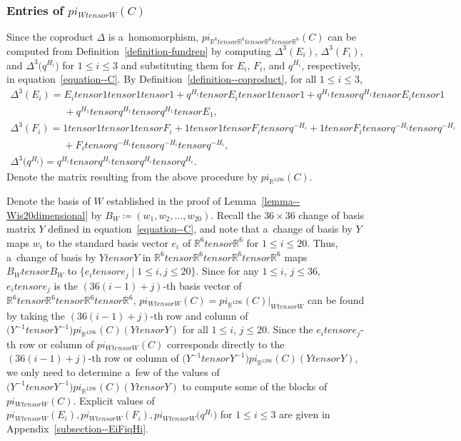 \documentclass[10pt,a4paper]{amsart}
\numberwithin{equation}{section}
\theoremstyle{definition}
\def\boldsymbol#1{#1}
\def\pi{pi}
\def\otimes{ tensor }
\begin{document}
\subsubsection[Entries of pi(W tensor W)(C)]{Entries of $\boldsymbol{\pi_{W \otimes W}(C)}$}
Since the coproduct $\Delta$ is a~homomorphism, $\pi_{\mathbb{R}^6 \otimes \mathbb{R}^6 \otimes \mathbb{R}^6 \otimes \mathbb{R}^6}(C)$ can be computed from Definition~\ref{definition-fundrep} by computing $\Delta^3(E_i)$, $\Delta^3(F_i)$, and $\Delta^3\bigl(q^{H_i}\bigr)$ for $1 \le i \le 3$ and substituting them for $E_i$, $F_i$, and $q^{H_i}$, respectively, in equation~\eqref{equation--C}. By Definition~\ref{definition--coproduct}, for all $1 \le i \le 3$,
\begin{gather*}
 \Delta^3 (E_i) = E_i \otimes 1 \otimes 1 \otimes 1 + q^{H_i} \otimes E_i \otimes 1 \otimes 1 + q^{H_1} \otimes q^{H_1} \otimes E_i \otimes 1\\
 \phantom{ \Delta^3 (E_i) =}{}+ q^{H_1} \otimes q^{H_1} \otimes q^{H_1} \otimes E_1 ,\\
 \Delta^3 (F_i) = 1 \otimes 1 \otimes 1 \otimes F_i + 1 \otimes 1 \otimes F_i \otimes q^{-H_i} + 1 \otimes F_i \otimes q^{-H_i} \otimes q^{-H_i}\\
 \phantom{\Delta^3 (F_i) =}{}+ F_i \otimes q^{-H_i} \otimes q^{-H_i} \otimes q^{-H_i} ,\\
 \Delta^3 \bigl(q^{H_i}\bigr) = q^{H_i} \otimes q^{H_i} \otimes q^{H_i} \otimes q^{H_i}.
\end{gather*}
Denote the matrix resulting from the above procedure by $\pi_{\mathbb{R}^{1296}} (C)$.


Denote the basis of $W$ established in the proof of Lemma~\ref{lemma--Wis20dimensional} by $B_W \coloneqq (w_1,w_2,\dots,w_{20})$. Recall the $36 \times 36$ change of basis matrix $Y$ defined in equation~\eqref{equation--C}, and note that a~change of basis by $Y$ maps $w_i$ to the standard basis vector $e_i$ of $\mathbb{R}^6 \otimes \mathbb{R}^6$ for $1 \le i \le 20$. Thus, a~change of basis by $Y \otimes Y$ in $\mathbb{R}^6 \otimes \mathbb{R}^6 \otimes \mathbb{R}^6 \otimes \mathbb{R}^6$ maps $B_W \otimes B_W$ to $\{e_i \otimes e_j \mid 1 \le i,j \le 20\}$. Since for any $1 \le i$, $j \le 36$, $e_i \otimes e_j$ is the $(36(i-1)+j)$-th basis vector of $\mathbb{R}^6 \otimes \mathbb{R}^6 \otimes \mathbb{R}^6 \otimes \mathbb{R}^6$, $\pi_{W \otimes W}(C) = \pi_{\mathbb{R}^{1296}}(C) |_{W \otimes W}$ can be found by taking the $(36(i-1)+j)$-th row and column of~${\bigl(Y^{-1} \otimes Y^{-1}\bigr)\pi_{\mathbb{R}^{1296}}(C)(Y \otimes Y)}$ for all $1 \le i$, $j \le 20$. Since the $e_i \otimes e_j$-th row or column of $\pi_{W \otimes W}(C)$ corresponds directly to the~${(36(i-1)+j)}$-th row or column of $\bigl(Y^{-1} \otimes Y^{-1}\bigr)\pi_{\mathbb{R}^{1296}}(C)(Y \otimes Y)$, we only need to determine a~few of the values of $\bigl(Y^{-1} \otimes Y^{-1}\bigr)\pi_{\mathbb{R}^{1296}}(C)(Y \otimes Y)$ to compute some of the blocks of $\pi_{W \otimes W}(C)$. Explicit values of $\pi_{W \otimes W}(E_i),\pi_{W \otimes W}(F_i),\pi_{W \otimes W}\bigl(q^{H_i}\bigr)$ for $1 \le i \le 3$ are given in Appendix~\ref{subsection--EiFiqHi}.
\end{document}

